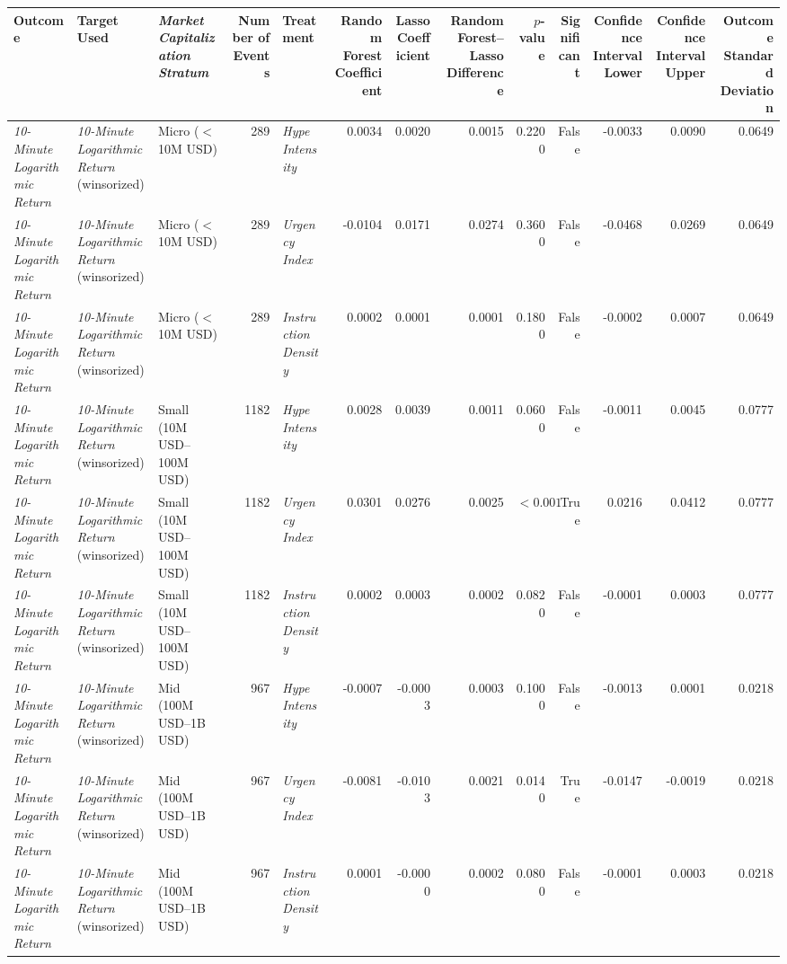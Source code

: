 \begin{tabular}{lllrlrrrrrrrr}
\toprule
Outcome & Target Used & \textit{Market Capitalization Stratum} & Number of Events & Treatment & Random Forest Coefficient & Lasso Coefficient & Random Forest--Lasso Difference & $p$-value & Significant & Confidence Interval Lower & Confidence Interval Upper & Outcome Standard Deviation \\
\midrule
\textit{10-Minute Logarithmic Return} & \textit{10-Minute Logarithmic Return} (winsorized) & Micro ($<$10M USD) & 289 & \textit{Hype Intensity} & 0.0034 & 0.0020 & 0.0015 & 0.2200 & False & -0.0033 & 0.0090 & 0.0649 \\
\textit{10-Minute Logarithmic Return} & \textit{10-Minute Logarithmic Return} (winsorized) & Micro ($<$10M USD) & 289 & \textit{Urgency Index} & -0.0104 & 0.0171 & 0.0274 & 0.3600 & False & -0.0468 & 0.0269 & 0.0649 \\
\textit{10-Minute Logarithmic Return} & \textit{10-Minute Logarithmic Return} (winsorized) & Micro ($<$10M USD) & 289 & \textit{Instruction Density} & 0.0002 & 0.0001 & 0.0001 & 0.1800 & False & -0.0002 & 0.0007 & 0.0649 \\
\textit{10-Minute Logarithmic Return} & \textit{10-Minute Logarithmic Return} (winsorized) & Small (10M USD--100M USD) & 1182 & \textit{Hype Intensity} & 0.0028 & 0.0039 & 0.0011 & 0.0600 & False & -0.0011 & 0.0045 & 0.0777 \\
\textit{10-Minute Logarithmic Return} & \textit{10-Minute Logarithmic Return} (winsorized) & Small (10M USD--100M USD) & 1182 & \textit{Urgency Index} & 0.0301 & 0.0276 & 0.0025 & $<0.001$ & True & 0.0216 & 0.0412 & 0.0777 \\
\textit{10-Minute Logarithmic Return} & \textit{10-Minute Logarithmic Return} (winsorized) & Small (10M USD--100M USD) & 1182 & \textit{Instruction Density} & 0.0002 & 0.0003 & 0.0002 & 0.0820 & False & -0.0001 & 0.0003 & 0.0777 \\
\textit{10-Minute Logarithmic Return} & \textit{10-Minute Logarithmic Return} (winsorized) & Mid (100M USD--1B USD) & 967 & \textit{Hype Intensity} & -0.0007 & -0.0003 & 0.0003 & 0.1000 & False & -0.0013 & 0.0001 & 0.0218 \\
\textit{10-Minute Logarithmic Return} & \textit{10-Minute Logarithmic Return} (winsorized) & Mid (100M USD--1B USD) & 967 & \textit{Urgency Index} & -0.0081 & -0.0103 & 0.0021 & 0.0140 & True & -0.0147 & -0.0019 & 0.0218 \\
\textit{10-Minute Logarithmic Return} & \textit{10-Minute Logarithmic Return} (winsorized) & Mid (100M USD--1B USD) & 967 & \textit{Instruction Density} & 0.0001 & -0.0000 & 0.0002 & 0.0800 & False & -0.0001 & 0.0003 & 0.0218 \\

\end{tabular}
